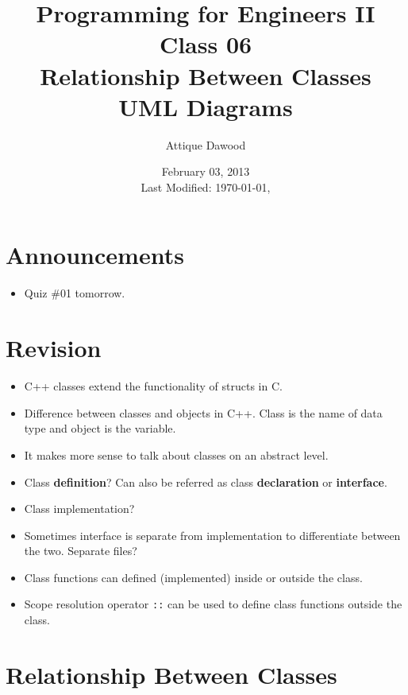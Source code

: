 \documentclass[12pt,a4paper]{article}
\title{\vspace{-2cm}Programming for Engineers II\\Class 06\\Relationship Between Classes\\UML Diagrams}
\author{Attique Dawood}
\date{February 03, 2013\\[0.2cm] Last Modified: \today, \currenttime}
\begin{document}
\maketitle
\section{Announcements}
\begin{itemize}
\item Quiz \#01 tomorrow.
\end{itemize}
\section{Revision}
\begin{itemize}
\item C++ classes extend the functionality of structs in C.
\item Difference between classes and objects in C++. Class is the name of data type and object is the variable.
\item It makes more sense to talk about classes on an abstract level.
\item Class \textbf{definition}? Can also be referred as class \textbf{declaration} or \textbf{interface}.
\item Class implementation?
\item Sometimes interface is separate from implementation to differentiate between the two. Separate files?
\item Class functions can defined (implemented) inside or outside the class.
\item Scope resolution operator \verb|::| can be used to define class functions outside the class.
\end{itemize}
\section{Relationship Between Classes}
\end{document}
